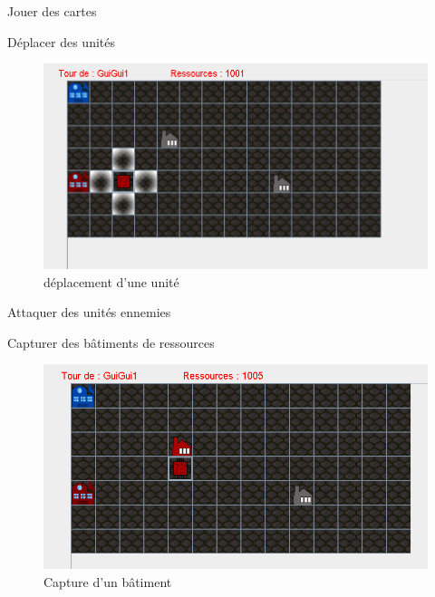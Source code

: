 \documentclass[a4paper,11pt]{report}
\begin{document}
	
	 Jouer des cartes
	
	 Déplacer des unités
	  \begin{figure}[th]
	 \begin{center}
	\includegraphics[scale=1]{Assets/UniteeSelectMove.png} 
	\caption{déplacement d'une unité}
     \label{MouvementUnité}
      \end{center}
    \end{figure}

	 
	Attaquer des unités ennemies
	
	Capturer des bâtiments de ressources
	
	 \begin{figure}[th]
	\begin{center}
	\includegraphics[scale=0.5]{Assets/CaptureSucces.png} 
	\caption{Capture d'un bâtiment}
     \label{CaptureBatiment}
      \end{center}
    \end{figure}
\end{document}
